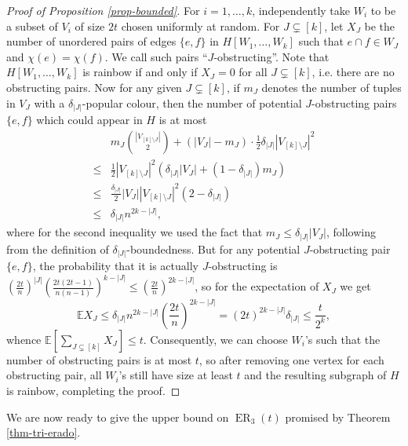 \documentclass[11pt]{article}
\theoremstyle{plain}
\theoremstyle{definition}
\newcommand{\erado}[2]{\operatorname{ER}_{#1}(#2)}
\newcommand{\expect}{\mathbb{E}}
\begin{document}
\begin{proof}[Proof of Proposition \ref{prop-bounded}]
    For $i=1,\dots,k$, independently take $W_i$ to be a subset of $V_i$ of size $2t$ chosen uniformly at random. For $J\subsetneq[k]$, let $X_J$ be the number of unordered pairs of edges $\{e,f\}$ in $H[W_1,\dots,W_k]$ such that $e\cap f\in W_J$ and $\chi(e)=\chi(f)$. We call such pairs ``$J$-obstructing''. Note that $H[W_1,\dots,W_k]$ is rainbow if and only if $X_J=0$ for all $J\subsetneq[k]$, i.e. there are no obstructing pairs. Now for any given $J\subsetneq[k]$, if $m_J$ denotes the number of tuples in $V_J$ with a $\delta_{|J|}$-popular colour, then the number of potential $J$-obstructing pairs $\{e,f\}$ which could appear in $H$ is at most
    \begin{align*}
        &m_J\binom{|V_{[k]\setminus J}|}{2}+(|V_J|-m_J)\cdot\frac{1}{2}\delta_{|J|}|V_{[k]\setminus J}|^2 \\
        \le{} &\frac{1}{2}|V_{[k]\setminus J}|^2\left(\delta_{|J|}|V_J|+(1-\delta_{|J|})m_J\right) \\
        \le{} &\frac{\delta_{|J|}}{2}|V_J||V_{[k]\setminus J}|^2(2-\delta_{|J|}) \\
        \le{} &\delta_{|J|}n^{2k-|J|},
    \end{align*}
    where for the second inequality we used the fact that $m_J\le \delta_{|J|}|V_J|$, following from the definition of $\delta_{|J|}$-boundedness. But for any potential $J$-obstructing pair $\{e,f\}$, the probability that it is actually $J$-obstructing is $\left(\frac{2t}{n}\right)^{|J|}\left(\frac{2t(2t-1)}{n(n-1)}\right)^{k-|J|}\le \left(\frac{2t}{n}\right)^{2k-|J|}$, so for the expectation of $X_J$ we get
    $$\expect X_J\le \delta_{|J|}n^{2k-|J|}\left(\frac{2t}{n}\right)^{2k-|J|}=(2t)^{2k-|J|}\delta_{|J|}\le \frac{t}{2^k},$$
    whence $\expect\left[\sum_{J\subsetneq[k]}X_J\right]\le t$. Consequently, we can choose $W_i$'s such that the number of obstructing pairs is at most $t$, so after removing one vertex for each obstructing pair, all $W_i$'s still have size at least $t$ and the resulting subgraph of $H$ is rainbow, completing the proof. 
\end{proof}

We are now ready to give the upper bound on $\erado{3}{t}$ promised by Theorem \ref{thm-tri-erado}.
\end{document}
